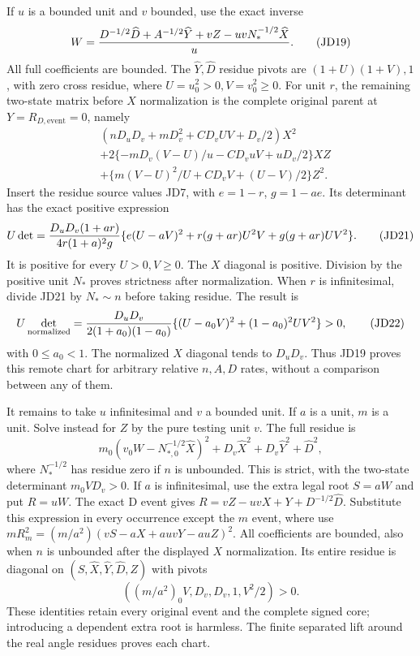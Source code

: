 If $u$ is a bounded unit and $v$ bounded, use the exact inverse
\[
 W={D^{-1/2}\widehat D+A^{-1/2}\widehat Y+vZ
                         -uvN_*^{-1/2}\widehat X\over u}.
                                                               \tag{JD19}
\]
All full coefficients are bounded.  The $\widehat Y,\widehat D$
residue pivots are $(1+U)(1+V),1$, with zero cross residue, where
$U=u_0^2>0,V=v_0^2\ge0$.  For unit $r$, the remaining two-state
matrix before $X$ normalization is the complete original parent at
$Y=R_{D,\mathrm{event}}=0$, namely
\[
 \begin{split}
 &(nD_uD_v+mD_v^2+CD_vUV+D_v/2)X^2\\
 &+2\{-mD_v(V-U)/u-CD_vuV+uD_v/2\}XZ\\
 &+\{m(V-U)^2/U+CD_vV+(U-V)/2\}Z^2.
 \end{split}                                                   \tag{JD20}
\]
Insert the residue source values JD7, with $e=1-r$, $g=1-ae$.
Its determinant has the exact positive expression
\[
 \begin{split}
 U\det={D_uD_v(1+ar)\over4r(1+a)^2g}
 \{e(U-aV)^2+r(g+ar)U^2V+g(g+ar)UV^2\}.             
 \end{split}\tag{JD21}
\]
It is positive for every $U>0,V\ge0$.  The $X$ diagonal is
positive.  Division by the positive unit $N_*$ proves strictness
after normalization.  When $r$ is infinitesimal, divide JD21 by
$N_*\sim n$ before taking residue.  The result is
\[
 U\det_{\rm normalized}
 ={D_uD_v\over2(1+a_0)(1-a_0)}
       \{(U-a_0V)^2+(1-a_0)^2UV^2\}>0,             \tag{JD22}
\]
with $0\le a_0<1$.  The normalized $X$ diagonal tends to $D_uD_v$.
Thus JD19 proves this remote chart for arbitrary relative $n,A,D$
rates, without a comparison between any of them.

It remains to take $u$ infinitesimal and $v$ a bounded unit.  If
$a$ is a unit, $m$ is a unit.  Solve instead for $Z$ by the pure
testing unit $v$.  The full residue is
\[
 m_0(v_0W-N_{*,0}^{-1/2}\widehat X)^2
       +D_v\widehat X^2+D_v\widehat Y^2+\widehat D^2,
                                                               \tag{JD23}
\]
where $N_*^{-1/2}$ has residue zero if $n$ is unbounded.  This is
strict, with the two-state determinant $m_0V D_v>0$.
If $a$ is infinitesimal, use the extra legal root $S=aW$ and put
$R=uW$.  The exact D event gives
$R=vZ-uvX+Y+D^{-1/2}\widehat D$.  Substitute this expression
in every occurrence except the $m$ event, where use
$mR_m^2=(m/a^2)(vS-aX+auvY-auZ)^2$.
All coefficients are bounded, also when $n$ is unbounded after
the displayed $X$ normalization.  Its entire residue is diagonal
on $(S,\widehat X,\widehat Y,\widehat D,Z)$ with pivots
\[
                    ((m/a^2)_0V,D_v,D_v,1,V^2/2)>0.   \tag{JD24}
\]
These identities retain every original event and the complete signed
core; introducing a dependent extra root is harmless.  The finite
separated lift around the real angle residues proves each chart.

